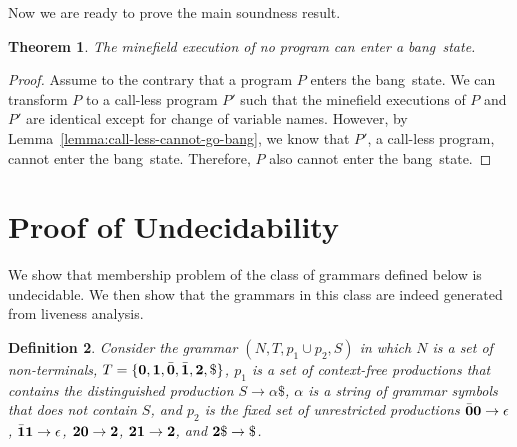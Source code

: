 \documentclass[9pt,nonatbib]{sigplanconf}
\newcommand{\bang}{\mbox{\sc bang}}
\newtheorem{theorem}{Theorem}[section]
\newtheorem{proposition}[theorem]{Proposition}
\newtheorem{definition}[theorem]{Definition}
\begin{document}
Now we are ready to prove the main soundness result.

\begin{theorem}
The  minefield  execution of  no  program  can enter  a
\bang\ state.
\end{theorem}
 
\begin{proof}
Assume to  the contrary that  a program $P$  enters the
\bang\  state.  We can  transform  $P$  to a  call-less
program $P'$ such that  the minefield executions of $P$
and $P'$  are identical  except for change  of variable
names.             However,                 by
Lemma~\ref{lemma:call-less-cannot-go-bang}, we know that
$P'$,   a   call-less   program,   cannot   enter   the
\bang\  state.  Therefore,   $P$  also  cannot  enter  the
\bang\ state.
\end{proof}


\section{Proof of Undecidability}
\label{sec:undec}
We show that  membership problem  of the  class of  grammars defined below 
is undecidable.   We then  show that  the grammars  in this  class are
indeed generated from liveness analysis.
\begin{definition}\label{def:specialgrammar}
Consider the  grammar $(N,T,  p_1\cup p_2,S)$  in which
$N$ is  a set  of non-terminals,  $T =  \{\mathbf{0}, \mathbf{1},
\bar{\mathbf{0}},  \bar{\mathbf{1}},  {\mathbf{2}},  \$\}$,   $p_1$  is  a  set  of
context-free    productions     that    contains    the
distinguished  production   $S  \rightarrow  \alpha\$$,
$\alpha$ is a  string of grammar symbols  that does not
contain $S$, and $p_2$ is the fixed set of unrestricted
productions    $\bar{\mathbf{0}}\mathbf{0}    \rightarrow    \epsilon$,
$\bar{\mathbf{1}}\mathbf{1}    \rightarrow   \epsilon$,    ${\mathbf{2}}\mathbf{0}
\rightarrow {\mathbf{2}}$,  ${\mathbf{2}}\mathbf{1} \rightarrow {\mathbf{2}}$,
and $\clazy\$ \rightarrow \$ $.
\end{definition}

\end{document}
